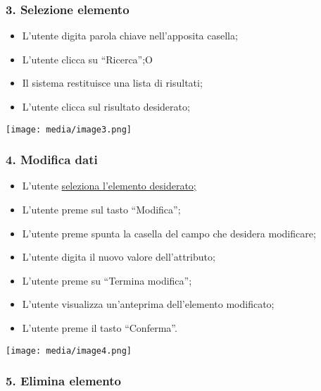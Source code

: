 \subsubsection{3. Selezione elemento}\label{selezione-elemento}

\begin{itemize}
\item
  L'utente digita parola chiave nell'apposita casella;
\item
  L'utente clicca su ``Ricerca'';O
\item
  Il sistema restituisce una lista di risultati;
\item
  L'utente clicca sul risultato desiderato;
\end{itemize}

\texttt{[image: media/image3.png]}

\subsubsection{}\label{section-4}

\subsubsection{4. Modifica dati}\label{modifica-dati}

\begin{itemize}
\item
  L'utente \ul{seleziona l'elemento desiderato;}
\item
  L'utente preme sul tasto ``Modifica'';
\item
  L'utente preme spunta la casella del campo che desidera modificare;
\item
  L'utente digita il nuovo valore dell'attributo;
\item
  L'utente preme su ``Termina modifica'';
\item
  L'utente visualizza un'anteprima dell'elemento modificato;
\item
  L'utente preme il tasto ``Conferma''.
\end{itemize}

\texttt{[image: media/image4.png]}

\subsubsection{}\label{section-5}

\subsubsection{5. Elimina elemento}\label{elimina-elemento}

